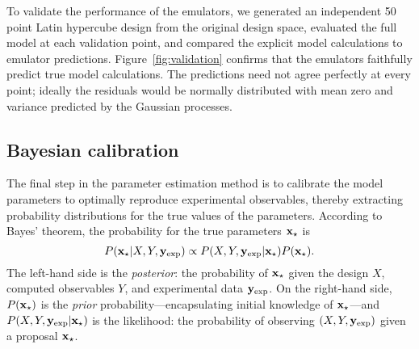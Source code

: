 \documentclass[aps,prc,reprint,amsmath,nofootinbib,noeprint]{revtex4-1}
\begin{document}
To validate the performance of the emulators, we generated an independent 50 point Latin hypercube design from the original design space, evaluated the full model at each validation point, and compared the explicit model calculations to emulator predictions.
Figure~\ref{fig:validation} confirms that the emulators faithfully predict true model calculations.
The predictions need not agree perfectly at every point; ideally the residuals would be normally distributed with mean zero and variance predicted by the Gaussian processes.

\subsection{Bayesian calibration}


\newcommand{\z}{\mathbf z}
\newcommand{\st}{_\star}
\newcommand{\ex}{_\text{exp}}

The final step in the parameter estimation method is to calibrate the model parameters to optimally reproduce experimental observables, thereby extracting probability distributions for the true values of the parameters.
According to Bayes' theorem, the probability for the true parameters $\x\st$ is
\begin{equation}
  P(\x\st|X,Y,\y\ex) \propto P(X,Y,\y\ex|\x\st) P(\x\st).
  \label{eq:bayes}
\end{equation}
The left-hand side is the \emph{posterior}: the probability of $\x\st$ given the design $X$, computed observables $Y$, and experimental data $\y\ex$.
On the right-hand side, $P(\x\st)$ is the \emph{prior} probability---encapsulating initial knowledge of $\x\st$---and $P(X,Y,\y\ex|\x\st)$ is the likelihood: the probability of observing $(X, Y, \y\ex)$ given a proposal $\x\st$.
\end{document}
